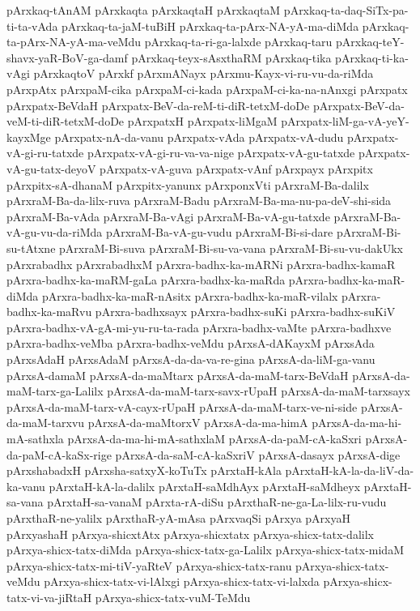 {pArxkaq-tAnAM
pArxkaqta
pArxkaqtaH
pArxkaqtaM
pArxkaq-ta-daq-SiTx-pa-ti-ta-vAda
pArxkaq-ta-jaM-tuBiH
pArxkaq-ta-pArx-NA-yA-ma-diMda
pArxkaq-ta-pArx-NA-yA-ma-veMdu
pArxkaq-ta-ri-ga-lalxde
pArxkaq-taru
pArxkaq-teY-shavx-yaR-BoV-ga-damf
pArxkaq-teyx-sAsxthaRM
pArxkaq-tika
pArxkaq-ti-ka-vAgi
pArxkaqtoV
pArxkf
pArxmANayx
pArxmu-Kayx-vi-ru-vu-da-riMda
pArxpAtx
pArxpaM-cika
pArxpaM-ci-kada
pArxpaM-ci-ka-na-nAnxgi
pArxpatx
pArxpatx-BeVdaH
pArxpatx-BeV-da-reM-ti-diR-tetxM-doDe
pArxpatx-BeV-da-veM-ti-diR-tetxM-doDe
pArxpatxH
pArxpatx-liMgaM
pArxpatx-liM-ga-vA-yeY-kayxMge
pArxpatx-nA-da-vanu
pArxpatx-vAda
pArxpatx-vA-dudu
pArxpatx-vA-gi-ru-tatxde
pArxpatx-vA-gi-ru-va-va-nige
pArxpatx-vA-gu-tatxde
pArxpatx-vA-gu-tatx-deyoV
pArxpatx-vA-guva
pArxpatx-vAnf
pArxpayx
pArxpitx
pArxpitx-sA-dhanaM
pArxpitx-yanunx
pArxponxVti
pArxraM-Ba-dalilx
pArxraM-Ba-da-lilx-ruva
pArxraM-Badu
pArxraM-Ba-ma-nu-pa-deV-shi-sida
pArxraM-Ba-vAda
pArxraM-Ba-vAgi
pArxraM-Ba-vA-gu-tatxde
pArxraM-Ba-vA-gu-vu-da-riMda
pArxraM-Ba-vA-gu-vudu
pArxraM-Bi-si-dare
pArxraM-Bi-su-tAtxne
pArxraM-Bi-suva
pArxraM-Bi-su-va-vana
pArxraM-Bi-su-vu-dakUkx
pArxrabadhx
pArxrabadhxM
pArxra-badhx-ka-mARNi
pArxra-badhx-kamaR
pArxra-badhx-ka-maRM-gaLa
pArxra-badhx-ka-maRda
pArxra-badhx-ka-maR-diMda
pArxra-badhx-ka-maR-nAsitx
pArxra-badhx-ka-maR-vilalx
pArxra-badhx-ka-maRvu
pArxra-badhxsayx
pArxra-badhx-suKi
pArxra-badhx-suKiV
pArxra-badhx-vA-gA-mi-yu-ru-ta-rada
pArxra-badhx-vaMte
pArxra-badhxve
pArxra-badhx-veMba
pArxra-badhx-veMdu
pArxsA-dAKayxM
pArxsAda
pArxsAdaH
pArxsAdaM
pArxsA-da-da-va-re-gina
pArxsA-da-liM-ga-vanu
pArxsA-damaM
pArxsA-da-maMtarx
pArxsA-da-maM-tarx-BeVdaH
pArxsA-da-maM-tarx-ga-Lalilx
pArxsA-da-maM-tarx-savx-rUpaH
pArxsA-da-maM-tarxsayx
pArxsA-da-maM-tarx-vA-cayx-rUpaH
pArxsA-da-maM-tarx-ve-ni-side
pArxsA-da-maM-tarxvu
pArxsA-da-maMtorxV
pArxsA-da-ma-himA
pArxsA-da-ma-hi-mA-sathxla
pArxsA-da-ma-hi-mA-sathxlaM
pArxsA-da-paM-cA-kaSxri
pArxsA-da-paM-cA-kaSx-rige
pArxsA-da-saM-cA-kaSxriV
pArxsA-dasayx
pArxsA-dige
pArxshabadxH
pArxsha-satxyX-koTuTx
pArxtaH-kAla
pArxtaH-kA-la-da-liV-da-ka-vanu
pArxtaH-kA-la-dalilx
pArxtaH-saMdhAyx
pArxtaH-saMdheyx
pArxtaH-sa-vana
pArxtaH-sa-vanaM
pArxta-rA-diSu
pArxthaR-ne-ga-La-lilx-ru-vudu
pArxthaR-ne-yalilx
pArxthaR-yA-mAsa
pArxvaqSi
pArxya
pArxyaH
pArxyashaH
pArxya-shicxtAtx
pArxya-shicxtatx
pArxya-shicx-tatx-dalilx
pArxya-shicx-tatx-diMda
pArxya-shicx-tatx-ga-Lalilx
pArxya-shicx-tatx-midaM
pArxya-shicx-tatx-mi-tiV-yaRteV
pArxya-shicx-tatx-ranu
pArxya-shicx-tatx-veMdu
pArxya-shicx-tatx-vi-lAlxgi
pArxya-shicx-tatx-vi-lalxda
pArxya-shicx-tatx-vi-va-jiRtaH
pArxya-shicx-tatx-vuM-TeMdu
}
